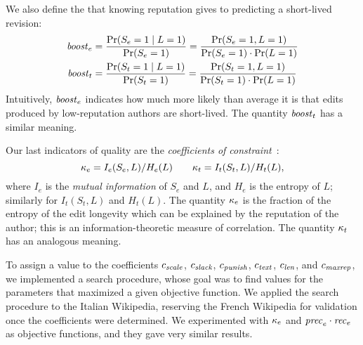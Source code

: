 We also define the  that knowing reputation gives
to predicting a short-lived revision:
%
\begin{align*}
  {\text{\textit{boost}}}_e & = \frac{\Pr(S_e=1 \mid L=1)}{\Pr(S_e=1)}
            = \frac{\Pr(S_e=1 , L=1)}{\Pr(S_e=1)\cdot\Pr(L=1)} \\
  {\text{\textit{boost}}}_t & = \frac{\Pr(S_t=1 \mid L=1)}{\Pr(S_t=1)}
            = \frac{\Pr(S_t=1 , L=1)}{\Pr(S_t=1)\cdot\Pr(L=1)}
\end{align*}
%
Intuitively, ${\text{\textit{boost}}}_e$ indicates how much more likely than average
it is that edits produced by low-reputation authors are short-lived.
The quantity ${\text{\textit{boost}}}_t$ has a similar meaning.

Our last indicators of quality are the
\textit{coefficients of constraint}~\cite{Coombs1970,Cover1991}:
\[
  \kappa_e = I_e(S_e,L) / H_e(L)
  \qquad
  \kappa_t = I_t(S_t,L) / H_t(L),
\]
where $I_e$ is the {\em mutual information\/} of $S_e$ and $L$,
and $H_e$ is the entropy of $L$;
similarly for $I_t(S_t,L)$ and $H_t(L)$.
The quantity $\kappa_e$ is the fraction of the entropy of the
edit longevity which can be explained by the reputation of the author;
this is an information-theoretic measure of correlation.
The quantity $\kappa_t$ has an analogous meaning.

To assign a value to the coefficients ${c_{{\text{\textit{scale}}}}}$, ${c_{{\text{\textit{slack}}}}}$,
${c_{{\text{\textit{punish}}}}}$, ${c_{{\text{\textit{text}}}}}$, ${c_{{\text{\textit{len}}}}}$, and ${c_{{\text{\textit{maxrep}}}}}$,
we implemented a search procedure, whose goal was to find values for
the parameters that maximized a given objective function.
We applied the search procedure to the Italian Wikipedia, reserving
the French Wikipedia for validation once the coefficients were
determined.
We experimented with $\kappa_e$ and ${\text{\textit{prec}}}_e \cdot {\text{\textit{rec}}}_e$
as objective functions, and they gave very similar results.

